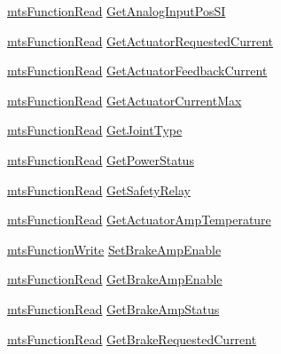 \begin{DoxyCompactItemize}
\item 
\hyperlink{classmts_function_read}{mts\+Function\+Read} \hyperlink{structmts_robot_i_o1394_qt_widget_1_1_robot_struct_a819b7a8bfbef4b02fee75b448798cceb}{Get\+Analog\+Input\+Pos\+S\+I}
\item 
\hyperlink{classmts_function_read}{mts\+Function\+Read} \hyperlink{structmts_robot_i_o1394_qt_widget_1_1_robot_struct_a4ccb02353fa96d91326391a595da27f1}{Get\+Actuator\+Requested\+Current}
\item 
\hyperlink{classmts_function_read}{mts\+Function\+Read} \hyperlink{structmts_robot_i_o1394_qt_widget_1_1_robot_struct_a8c773e48b0677c73fd1532e5c2741503}{Get\+Actuator\+Feedback\+Current}
\item 
\hyperlink{classmts_function_read}{mts\+Function\+Read} \hyperlink{structmts_robot_i_o1394_qt_widget_1_1_robot_struct_a689285f24e9c4096619842be465b1323}{Get\+Actuator\+Current\+Max}
\item 
\hyperlink{classmts_function_read}{mts\+Function\+Read} \hyperlink{structmts_robot_i_o1394_qt_widget_1_1_robot_struct_ac0aad3722e34e0dcde09022a09a754ac}{Get\+Joint\+Type}
\item 
\hyperlink{classmts_function_read}{mts\+Function\+Read} \hyperlink{structmts_robot_i_o1394_qt_widget_1_1_robot_struct_a60b44e1e41d496937ea025c512c512fb}{Get\+Power\+Status}
\item 
\hyperlink{classmts_function_read}{mts\+Function\+Read} \hyperlink{structmts_robot_i_o1394_qt_widget_1_1_robot_struct_a134a6439726e8afe32fba42603249fff}{Get\+Safety\+Relay}
\item 
\hyperlink{classmts_function_read}{mts\+Function\+Read} \hyperlink{structmts_robot_i_o1394_qt_widget_1_1_robot_struct_a9bc640e0bebd11be3d4c68073b7e44f6}{Get\+Actuator\+Amp\+Temperature}
\item 
\hyperlink{classmts_function_write}{mts\+Function\+Write} \hyperlink{structmts_robot_i_o1394_qt_widget_1_1_robot_struct_ad417df4f69d6495b513bab95282c5d1c}{Set\+Brake\+Amp\+Enable}
\item 
\hyperlink{classmts_function_read}{mts\+Function\+Read} \hyperlink{structmts_robot_i_o1394_qt_widget_1_1_robot_struct_a7e28f52f68f9a30e33438867d39c0253}{Get\+Brake\+Amp\+Enable}
\item 
\hyperlink{classmts_function_read}{mts\+Function\+Read} \hyperlink{structmts_robot_i_o1394_qt_widget_1_1_robot_struct_a9b1c8db686bd9e22c2f3e265cfff5ea9}{Get\+Brake\+Amp\+Status}
\item 
\hyperlink{classmts_function_read}{mts\+Function\+Read} \hyperlink{structmts_robot_i_o1394_qt_widget_1_1_robot_struct_a146b0df0258f6c9115412710c0452d71}{Get\+Brake\+Requested\+Current}

\end{DoxyCompactItemize}
